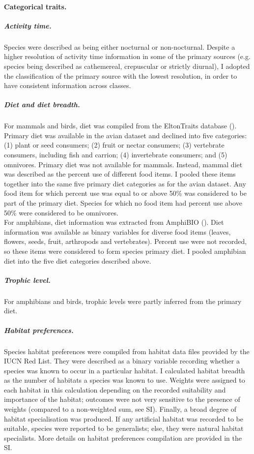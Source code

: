 \paragraph{Categorical traits.}
\subparagraph{Activity time.}
Species were described as being either nocturnal or non-nocturnal. Despite a higher resolution of activity time information in some of the primary sources (e.g. species being described as cathemereal, crepuscular or strictly diurnal), I adopted the classification of the primary source with the lowest resolution, in order to have consistent information across classes.
\subparagraph{Diet and diet breadth.}
For mammals and birds, diet was compiled from the EltonTraits database (\cite{Wilman2014}). Primary diet was available in the avian dataset and declined into five categories: (1) plant or seed consumers; (2) fruit or nectar consumers; (3) vertebrate consumers, including fish and carrion; (4) invertebrate consumers; and (5) omnivores. Primary diet was not available for mammals. Instead, mammal diet was described as the percent use of different food items. I pooled these items together into the same five primary diet categories as for the avian dataset. Any food item for which percent use was equal to or above 50\% was considered to be part of the primary diet. Species for which no food item had percent use above 50\% were considered to be omnivores.\\ 
For amphibians, diet information was extracted from AmphiBIO (\cite{Oliveira2017}). Diet information was available as binary variables for diverse food items (leaves, flowers, seeds, fruit, arthropods and vertebrates). Percent use were not recorded, so these items were considered to form species primary diet. I pooled amphibian diet into the five diet categories described above.
\subparagraph{Trophic level.} For amphibians and birds, trophic levels were partly inferred from the primary diet. 
\subparagraph{Habitat preferences.}
Species habitat preferences were compiled from habitat data files provided by the IUCN Red List. They were described as a binary variable recording whether a species was known to occur in a particular habitat. I calculated habitat breadth as the number of habitats a species was known to use. Weights were assigned to each habitat in this calculation depending on the recorded suitability and importance of the habitat; outcomes were not very sensitive to the presence of weights (compared to a non-weighted sum, see SI). Finally, a broad degree of habitat specialisation was produced. If any artificial habitat was recorded to be suitable, species were reported to be generalists; else, they were natural habitat specialists. More details on habitat preferences compilation are provided in the SI. 

